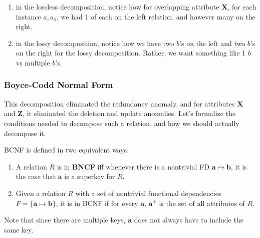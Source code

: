 \begin{example}
    \begin{enumerate}
      \item in the lossless decomposition, notice how for overlapping attribute \textbf{X}, for each instance $a, a_1$, we had 1 of each on the left relation, and however many on the right. 
      \item in the lossy decomposition, notice how we have two $b$'s on the left and two $b$'s on the right for the lossy decomposition. Rather, we want something like 1 $b$ vs multiple $b$'s.
    \end{enumerate}
  \end{example}

\subsubsection{Boyce-Codd Normal Form}

  This decomposition eliminated the redundancy anomaly, and for attributes \textbf{X} and \textbf{Z}, it eliminated the deletion and update anomalies. Let's formalize the conditions needed to decompose such a relation, and how we should actually decompose it. 

  \begin{definition}[BNCF]
    BCNF is defined in two equivalent ways: 
    \begin{enumerate}
      \item A relation $R$ is in \textbf{BNCF} iff whenever there is a nontrivial FD $\mathbf{a} \mapsto \mathbf{b}$, it is the case that $\mathbf{a}$ is a superkey for $R$. 
      \item Given a relation $R$ with a set of nontrivial functional dependencies $F = \{\mathbf{a} \mapsto \mathbf{b}\}$, it is in BCNF if for every $\mathbf{a}$, $\mathbf{a}^+$ is the set of all attributes of $R$. 
    \end{enumerate}
    Note that since there are multiple keys, $\mathbf{a}$ does not always have to include the same key. 
  \end{definition}

